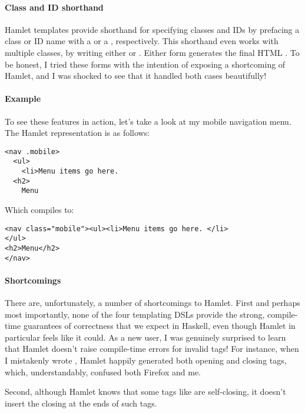 \paragraph{Class and ID shorthand} Hamlet templates provide shorthand for specifying classes and IDs by prefacing a class or ID name with a  or a \code{\#}, respectively. This shorthand even works with multiple classes, by writing either  or . Either form generates the final HTML . To be honest, I tried these forms with the intention of exposing a shortcoming of Hamlet, and I was shocked to see that it handled both cases beautifully!

\paragraph{Example} To see these features in action, let's take a look at my mobile navigation menu. The Hamlet representation is as follows: 

\begin{Verbatim}
<nav .mobile>
  <ul>
    <li>Menu items go here. 
  <h2>
    Menu
\end{Verbatim}

Which compiles to:

\begin{Verbatim}
<nav class="mobile"><ul><li>Menu items go here. </li>
</ul>
<h2>Menu</h2>
</nav>
\end{Verbatim}

\paragraph{Shortcomings} There are, unfortunately, a number of shortcomings to Hamlet. First and perhaps most importantly, none of the four templating DSLs provide the strong, compile-time guarantees of correctness that we expect in Haskell, even though Hamlet in particular feels like it could. As a new user, I was genuinely surprised to learn that Hamlet doesn't raise compile-time errors for invalid tags! For instance, when I mistakenly wrote , Hamlet happily generated both opening and closing  tags, which, understandably, confused both Firefox and me.

Second, although Hamlet knows that some tags like  are self-closing, it doesn't insert the closing \code{/} at the ends of such tags.

